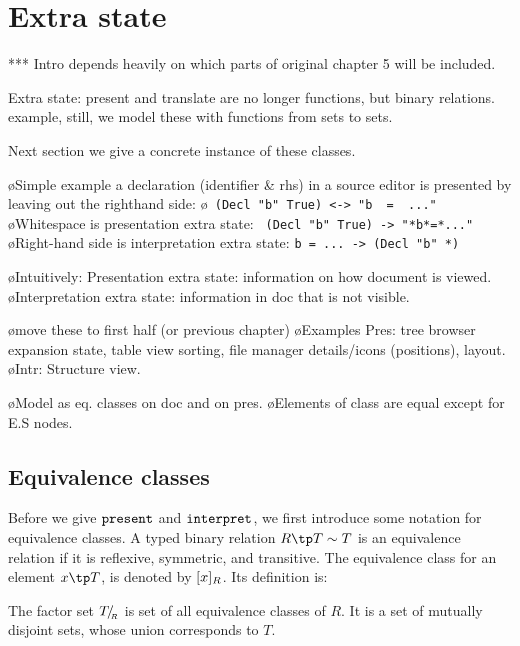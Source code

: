 %																
%																
%																
\section{Extra state} \label{sect:singleExtra}

\toHere

*** Intro depends heavily on which parts of original chapter 5 will be included.

Extra state: present and translate are no longer functions, but binary relations. example, still, we model these with functions from sets to sets.

Next section we give a concrete instance of these classes.

\bl
\o Simple example a declaration (identifier \& rhs) in a source editor is presented by leaving out the righthand side:
\o  \verb| (Decl "b" True) <-> "b  =  ..."|
\o Whitespace is presentation extra state: \verb| (Decl "b" True) -> "*b*=*..."|
\o Right-hand side is interpretation extra state: \verb|b = ... -> (Decl "b" *)|
\el

\bl
\o Intuitively: Presentation extra state: information on how document is viewed. 
\o Interpretation extra state: information in doc that is not visible. 
\el

\bl
\o move these to first half (or previous chapter)
\o Examples Pres: tree browser expansion state, table view sorting, file manager details/icons (positions), layout.
\o Intr: Structure view.
\el

\bl
\o Model as eq. classes on doc and on pres.
\o Elements of class are equal except for E.S nodes.
\el
\fromHere


\subsection{Equivalence classes}

Before we give ${\tt present}$ and ${\tt interpret}$, we first introduce some notation for equivalence classes. A typed binary relation $R \tp T \rel T$ is an equivalence relation if it is reflexive, symmetric, and transitive.  The equivalence class for an element $x \tp T$, is denoted by $[{x}]_{{R}}$. Its definition is:


The factor set ${T}\!/_{{_{\!\!{R}}}}$ is set of all equivalence classes of $R$. It is a set of mutually disjoint sets, whose union corresponds to $T$.

